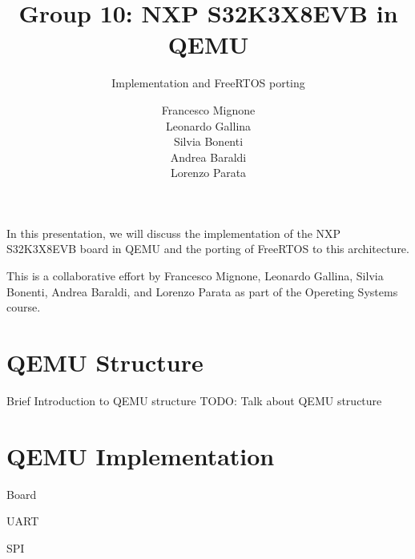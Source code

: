 \documentclass{beamer}
\title{Group 10: NXP S32K3X8EVB in QEMU}
\subtitle{Implementation and FreeRTOS porting}
\author{Francesco Mignone \\ Leonardo Gallina \\ Silvia Bonenti \\ Andrea Baraldi \\ Lorenzo Parata}
\newcommand{\hrefcol}[2]{\textcolor{cyan}{\href{#1}{#2}}}
\begin{document}
\maketitle

\begin{frame}

In this presentation, we will discuss the implementation of the NXP S32K3X8EVB board in QEMU and the porting of FreeRTOS to this architecture.

\vspace{\baselineskip}

This is a collaborative effort by Francesco Mignone, Leonardo Gallina, Silvia Bonenti, Andrea Baraldi, and Lorenzo Parata as part of the Opereting Systems course.


\end{frame}

\section{QEMU Structure}

\begin{frame}{Brief Introduction to QEMU structure}
TODO: Talk about QEMU structure
\begin{itemize}
\end{itemize}
\end{frame}

\section{QEMU Implementation}

\footlinecolor{}
\begin{frame}[fragile]{Board}
\begin{itemize}
\end{itemize}
\end{frame}


\footlinecolor{}
\begin{frame}[fragile]{UART}
\begin{itemize}
\end{itemize}
\end{frame}

\footlinecolor{}
\begin{frame}[fragile]{SPI}
\begin{itemize}
\end{itemize}
\end{frame}
\end{document}
